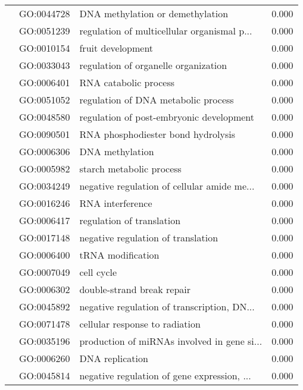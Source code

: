 \begin{longtable}{lllr}
   & GO:0044728 &             DNA methylation or demethylation &         0.000 \\
   & GO:0051239 &  regulation of multicellular organismal p... &         0.000 \\
   & GO:0010154 &                            fruit development &         0.000 \\
   & GO:0033043 &         regulation of organelle organization &         0.000 \\
   & GO:0006401 &                        RNA catabolic process &         0.000 \\
   & GO:0051052 &          regulation of DNA metabolic process &         0.000 \\
   & GO:0048580 &     regulation of post-embryonic development &         0.000 \\
   & GO:0090501 &           RNA phosphodiester bond hydrolysis &         0.000 \\
   & GO:0006306 &                              DNA methylation &         0.000 \\
   & GO:0005982 &                     starch metabolic process &         0.000 \\
   & GO:0034249 &  negative regulation of cellular amide me... &         0.000 \\
   & GO:0016246 &                             RNA interference &         0.000 \\
   & GO:0006417 &                    regulation of translation &         0.000 \\
   & GO:0017148 &           negative regulation of translation &         0.000 \\
   & GO:0006400 &                            tRNA modification &         0.000 \\
   & GO:0007049 &                                   cell cycle &         0.000 \\
   & GO:0006302 &                   double-strand break repair &         0.000 \\
   & GO:0045892 &  negative regulation of transcription, DN... &         0.000 \\
   & GO:0071478 &               cellular response to radiation &         0.000 \\
   & GO:0035196 &  production of miRNAs involved in gene si... &         0.000 \\
   & GO:0006260 &                              DNA replication &         0.000 \\
   & GO:0045814 &  negative regulation of gene expression, ... &         0.000 \\

\end{longtable}
